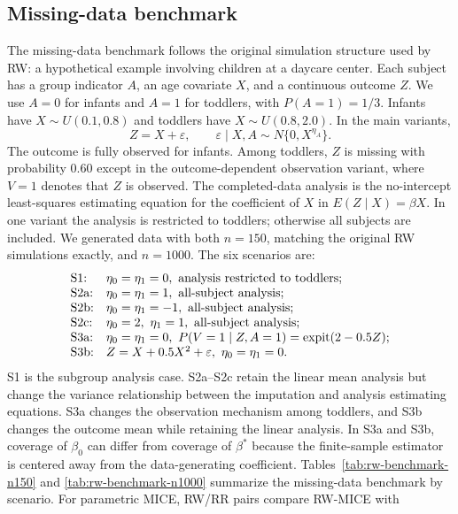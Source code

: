 \subsection{Missing-data benchmark}
\label{simulation-rw-setting}
The missing-data benchmark follows the original simulation structure
used by RW: a hypothetical example involving children at a daycare
center.  Each subject has a group indicator \(A\), an
age covariate \(X\), and a continuous outcome \(Z\).
We use \(A=0\) for infants and \(A=1\) for toddlers, with
\(P(A=1)=1/3\).  Infants have \(X\sim U(0.1,0.8)\) and toddlers have
\(X\sim U(0.8,2.0)\).  In the main variants,
\[
  Z=X+\varepsilon,\qquad
  \varepsilon\mid X,A\sim N\{0,X^{\eta_A}\}.
\]
The outcome is fully observed for infants.  Among toddlers, \(Z\) is
missing with probability 0.60 except in the outcome-dependent
observation variant, where \(V=1\) denotes that \(Z\) is observed.  The
completed-data analysis is the no-intercept least-squares estimating
equation for the coefficient of \(X\) in \(E(Z\mid X)=\beta X\).  In
one variant the analysis is restricted to toddlers; otherwise all
subjects are included.  We generated data with both \(n=150\), matching
the original RW simulations exactly, and \(n=1000\).
The six scenarios are:
\[
\begin{array}{ll}
\text{S1:}  & \eta_0=\eta_1=0,\ \text{analysis restricted to toddlers};\\
\text{S2a:} & \eta_0=\eta_1=1,\ \text{all-subject analysis};\\
\text{S2b:} & \eta_0=\eta_1=-1,\ \text{all-subject analysis};\\
\text{S2c:} & \eta_0=2,\ \eta_1=1,\ \text{all-subject analysis};\\
\text{S3a:} & \eta_0=\eta_1=0,\ P(V=1\mid Z,A=1)=\operatorname{expit}(2-0.5Z);\\
\text{S3b:} & Z=X+0.5X^2+\varepsilon,\ \eta_0=\eta_1=0.
\end{array}
\]
S1 is the subgroup analysis case.  S2a--S2c retain the linear mean
analysis but change the variance relationship between the imputation
and analysis estimating equations.  S3a changes the observation
mechanism among toddlers, and S3b changes the outcome mean while
retaining the linear analysis.  In S3a and S3b, coverage of
\(\beta_0\) can differ from coverage of \(\beta^\ast\) because the
finite-sample estimator is centered away from the data-generating
coefficient.
Tables~\ref{tab:rw-benchmark-n150} and
\ref{tab:rw-benchmark-n1000} summarize the missing-data benchmark by
scenario.
For parametric MICE, RW/RR pairs compare RW-MICE with

